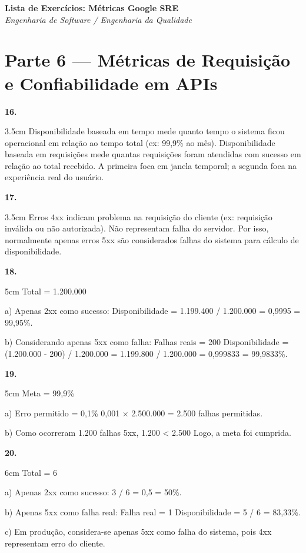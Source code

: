 \documentclass[12pt]{article}
\begin{document}
\begin{center}
  {\Large \textbf{Lista de Exercícios: Métricas Google SRE}}\\[0.2cm]
  \textit{Engenharia de Software / Engenharia da Qualidade}
\end{center}

\vspace{0.4cm}

\section*{Parte 6 — Métricas de Requisição e Confiabilidade em APIs}

\textbf{16.}
\begin{resposta}{3.5cm}
Disponibilidade baseada em tempo mede quanto tempo o sistema ficou operacional em relação ao tempo total (ex: 99,9\% ao mês).  
Disponibilidade baseada em requisições mede quantas requisições foram atendidas com sucesso em relação ao total recebido.  
A primeira foca em janela temporal; a segunda foca na experiência real do usuário.
\end{resposta}

\textbf{17.}
\begin{resposta}{3.5cm}
Erros 4xx indicam problema na requisição do cliente (ex: requisição inválida ou não autorizada).  
Não representam falha do servidor.  
Por isso, normalmente apenas erros 5xx são considerados falhas do sistema para cálculo de disponibilidade.
\end{resposta}

\textbf{18.}
\begin{resposta}{5cm}
Total = 1.200.000  

a) Apenas 2xx como sucesso:  
Disponibilidade = 1.199.400 / 1.200.000 = 0,9995 = 99,95\%.

b) Considerando apenas 5xx como falha:  
Falhas reais = 200  
Disponibilidade = (1.200.000 - 200) / 1.200.000  
= 1.199.800 / 1.200.000  
= 0,999833 = 99,9833\%.
\end{resposta}

\textbf{19.}
\begin{resposta}{5cm}
Meta = 99,9\%  

a) Erro permitido = 0,1\%  
0,001 × 2.500.000 = 2.500 falhas permitidas.

b) Como ocorreram 1.200 falhas 5xx,  
1.200 < 2.500  
Logo, a meta foi cumprida.
\end{resposta}

\textbf{20.}
\begin{resposta}{6cm}
Total = 6  

a) Apenas 2xx como sucesso:  
3 / 6 = 0,5 = 50\%.

b) Apenas 5xx como falha real:  
Falha real = 1  
Disponibilidade = 5 / 6 = 83,33\%.

c) Em produção, considera-se apenas 5xx como falha do sistema, pois 4xx representam erro do cliente.
\end{resposta}
\end{document}
